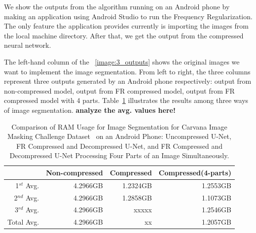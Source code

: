 \documentclass[conference]{IEEEtran}
\begin{document}
We show the outputs from the algorithm running on an Android phone by making an application using Android Studio to run the Frequency Regularization. The only feature the application provides currently is importing the images from the local machine directory. After that, we get the output from the compressed neural network. 

The left-hand column of the ~\ref{image:3_outputs} shows the original images we want to implement the image segmentation. From left to right, the three columns represent three outputs generated by an Android phone respectively: output from non-compressed model, output from FR compressed model, output from FR compressed model with 4 parts. Table~\ref{table:ram_usage} illustrates the results among three ways of image segmentation. \textbf{{analyze the avg. values here!}}



\begin{table}[H]
	\caption{Comparison of RAM Usage for Image Segmentation for Carvana Image Masking Challenge Dataset~\cite{brian2017carvanadataset} on an Android Phone: Uncompressed U-Net, FR Compressed and Decompressed U-Net, and FR Compressed and Decompressed U-Net Processing Four Parts of an Image Simultaneously.} 
	\label{table:ram_usage}
	\small
	\centering
	\begin{tabular}{rrrr}
		\toprule
		&Non-compressed&Compressed&Compressed(4-parts)\\
		\midrule\midrule
		1$^{st}$ Avg.&4.2966GB&1.2324GB&1.2553GB\\
		2$^{nd}$ Avg.&4.2966GB&1.2858GB&1.1073GB\\
		3$^{rd}$ Avg.&4.2966GB&xxxxx&1.2546GB\\
		\cdashline{1-4}
		Total Avg.&4.2966GB&xx&1.2057GB\\
		\bottomrule
	\end{tabular}
\end{table}
\end{document}
